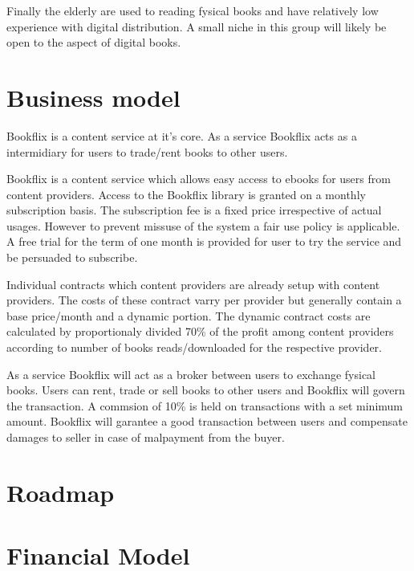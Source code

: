 Finally the elderly are used to reading fysical books and have relatively low experience with digital distribution.
A small niche in this group will likely be open to the aspect of digital books.


\section{Business model}
Bookflix is a content service at it's core.
As a service Bookflix acts as a intermidiary for users to trade/rent books to other users.

Bookflix is a content service which allows easy access to ebooks for users from content providers.
Access to the Bookflix library is granted on a monthly subscription basis.
The subscription fee is a fixed price irrespective of actual usages.
However to prevent missuse of the system a fair use policy is applicable.
A free trial for the term of one month is provided for user to try the service and be persuaded to subscribe.

Individual contracts which content providers are already setup with content providers.
The costs of these contract varry per provider but generally contain a base price/month and a dynamic portion.
The dynamic contract costs are calculated by proportionaly divided 70\% of the profit among content providers according to number of books reads/downloaded for the respective provider.

As a service Bookflix will act as a broker between users to exchange fysical books.
Users can rent, trade or sell books to other users and Bookflix will govern the transaction.
A commsion of 10\% is held on transactions with a set minimum amount.
Bookflix will garantee a good transaction between users and compensate damages to seller in case of malpayment from the buyer.

\section{Roadmap}


\section{Financial Model}
